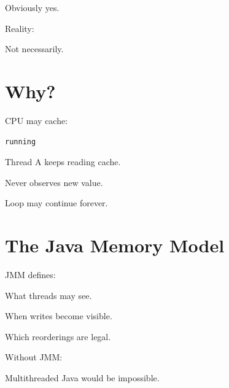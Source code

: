 \documentclass[11pt,a4paper]{book}
\begin{document}
Obviously yes.


Reality:


Not necessarily.


\section{Why?}

CPU may cache:

\begin{verbatim} 
running
\end{verbatim}


Thread A keeps reading cache.


Never observes new value.


Loop may continue forever.


\section{The Java Memory Model}

JMM defines:


What threads may see.


When writes become visible.


Which reorderings are legal.


Without JMM:


Multithreaded Java would be impossible.
\end{document}

